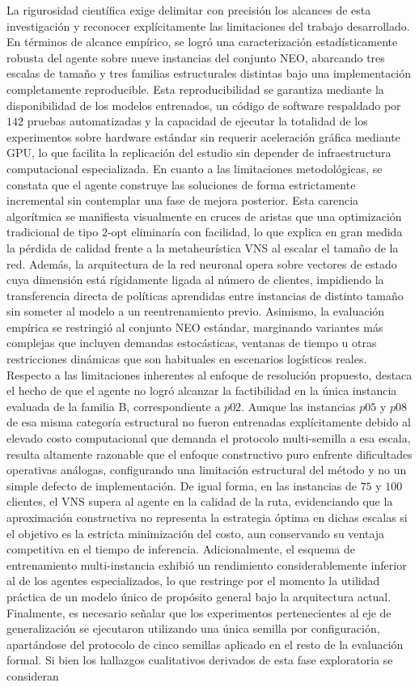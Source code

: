 La rigurosidad científica exige delimitar con precisión los alcances de esta investigación y reconocer explícitamente las limitaciones del trabajo desarrollado. En términos de alcance empírico, se logró una caracterización estadísticamente robusta del agente sobre nueve instancias del conjunto NEO, abarcando tres escalas de tamaño y tres familias estructurales distintas bajo una implementación completamente reproducible. Esta reproducibilidad se garantiza mediante la disponibilidad de los modelos entrenados, un código de software respaldado por $142$ pruebas automatizadas y la capacidad de ejecutar la totalidad de los experimentos sobre hardware estándar sin requerir aceleración gráfica mediante GPU, lo que facilita la replicación del estudio sin depender de infraestructura computacional especializada. En cuanto a las limitaciones metodológicas, se constata que el agente construye las soluciones de forma estrictamente incremental sin contemplar una fase de mejora posterior. Esta carencia algorítmica se manifiesta visualmente en cruces de aristas que una optimización tradicional de tipo $2$-opt eliminaría con facilidad, lo que explica en gran medida la pérdida de calidad frente a la metaheurística VNS al escalar el tamaño de la red. Además, la arquitectura de la red neuronal opera sobre vectores de estado cuya dimensión está rígidamente ligada al número de clientes, impidiendo la transferencia directa de políticas aprendidas entre instancias de distinto tamaño sin someter al modelo a un reentrenamiento previo. Asimismo, la evaluación empírica se restringió al conjunto NEO estándar, marginando variantes más complejas que incluyen demandas estocásticas, ventanas de tiempo u otras restricciones dinámicas que son habituales en escenarios logísticos reales. Respecto a las limitaciones inherentes al enfoque de resolución propuesto, destaca el hecho de que el agente no logró alcanzar la factibilidad en la única instancia evaluada de la familia B, correspondiente a $p02$. Aunque las instancias $p05$ y $p08$ de esa misma categoría estructural no fueron entrenadas explícitamente debido al elevado costo computacional que demanda el protocolo multi-semilla a esa escala, resulta altamente razonable que el enfoque constructivo puro enfrente dificultades operativas análogas, configurando una limitación estructural del método y no un simple defecto de implementación. De igual forma, en las instancias de $75$ y $100$ clientes, el VNS supera al agente en la calidad de la ruta, evidenciando que la aproximación constructiva no representa la estrategia óptima en dichas escalas si el objetivo es la estricta minimización del costo, aun conservando su ventaja competitiva en el tiempo de inferencia. Adicionalmente, el esquema de entrenamiento multi-instancia exhibió un rendimiento considerablemente inferior al de los agentes especializados, lo que restringe por el momento la utilidad práctica de un modelo único de propósito general bajo la arquitectura actual. Finalmente, es necesario señalar que los experimentos pertenecientes al eje de generalización se ejecutaron utilizando una única semilla por configuración, apartándose del protocolo de cinco semillas aplicado en el resto de la evaluación formal. Si bien los hallazgos cualitativos derivados de esta fase exploratoria se consideran 